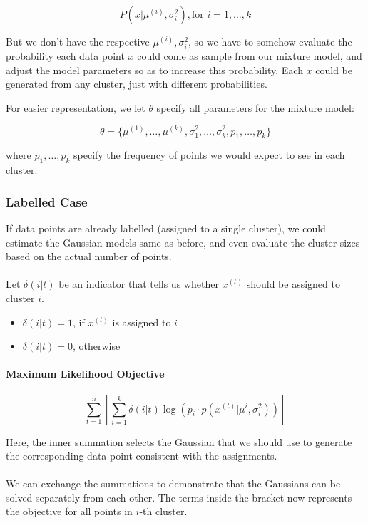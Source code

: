 \documentclass[a4paper]{article}
\begin{document}
$$ P(x| \mu^{(i)}, \sigma_i^2), \text{for } i = 1,\ldots,k $$

\noindent But we don't have the respective $\mu^{(i)}, \sigma_i^2$, so we have to somehow evaluate the probability each data point $x$ could come as sample from our mixture model, and adjust the model parameters so as to increase this probability. Each $x$ could be generated from any cluster, just with different probabilities.

\noindent For easier representation, we let $\theta$ specify all parameters for the mixture model:

$$ \theta = \{\mu^{(1)},\ldots, \mu^{(k)}, \sigma^2_1,\ldots,\sigma^2_k, p_1,\ldots, p_k \} $$

\noindent where $p_1, \ldots, p_k$ specify the frequency of points we would expect to see in each cluster.

\subsubsection{Labelled Case}

If data points are already labelled (assigned to a single cluster), we could estimate the Gaussian models same as before, and even evaluate the cluster sizes based on the actual number of points.\\
\\
\noindent Let $\delta(i|t)$ be an indicator that tells us whether $x^{(t)}$ should be assigned to cluster $i$.

\begin{itemize}
	\item $\delta(i|t) = 1$, if $x^{(t)}$ is assigned to $i$
	\item $\delta(i|t) = 0$, otherwise
\end{itemize}

\paragraph{Maximum Likelihood Objective}
$$\sum_{t=1}^n\left[\sum_{i=1}^k \delta(i|t)\log\left(p_i\cdot p(x^{(t)}|\mu^{i}, \sigma^2_i)\right)\right]$$

\noindent Here, the inner summation selects the Gaussian that we should use to generate the corresponding data point consistent with the assignments.\\
\\
\noindent We can exchange the summations to demonstrate that the Gaussians can be solved separately from each other. The terms inside the bracket now represents the objective for all points in $i$-th cluster.
\end{document}
